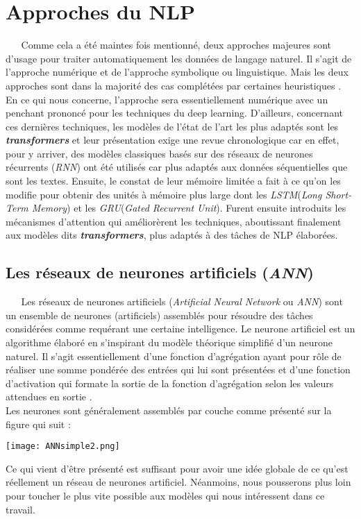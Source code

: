 \section{Approches du NLP}
$ _{} $ $ _{} $ $ _{} $ $ _{} $ $ _{} $Comme cela a été maintes fois mentionné, deux approches majeures sont d'usage pour traiter automatiquement les données de langage naturel. Il s'agit de l'approche numérique et de l'approche symbolique ou linguistique. Mais les deux approches sont dans la majorité des cas complétées par certaines heuristiques \cite{maaloul:tel-00756111}.\\
En ce qui nous concerne, l'approche sera essentiellement numérique avec un penchant prononcé pour les techniques du deep learning. D'ailleurs, concernant ces dernières techniques, les modèles de l'état de l'art les plus adaptés sont les \textbf{\textit{transformers}} et leur présentation exige une revue chronologique car en effet, pour y arriver, des modèles classiques basés sur des réseaux de neurones récurrents (\textit{RNN}) ont été utilisés car plus adaptés aux données séquentielles que sont les textes. Ensuite, le constat de leur mémoire limitée a fait à ce qu'on les modifie pour obtenir des unités à mémoire plus large dont les \textit{LSTM}(\textit{Long Short-Term Memory}) et les \textit{GRU}(\textit{Gated Recurrent Unit}). Furent ensuite introduits les mécanismes d'attention qui améliorèrent les techniques, aboutissant fi\-na\-le\-ment aux modèles dits \textit{\textbf{transformers}}, plus adaptés à des tâches de NLP élaborées.
\subsection{Les réseaux de neurones artificiels (\textit{ANN})}
$ _{} $ $ _{} $ $ _{} $ $ _{} $ $ _{} $Les réseaux de neurones artificiels (\textit{Artificial Neural Network} ou \textit{ANN}) sont un ensemble de neurones (artificiels) assemblés pour résoudre des tâches considérées comme requérant une certaine intelligence. Le neurone artificiel est un algorithme élaboré en s'inspirant du modèle théorique simplifié d'un neurone naturel. Il s'agit essentiellement d'une fonction d'agrégation ayant pour rôle de réaliser une somme pondérée des entrées qui lui sont présentées et d'une fonction d'activation qui formate la sortie de la fonction d'agrégation selon les valeurs attendues en sortie \cite{ANN}.\\
Les neurones sont généralement assemblés par couche comme présenté sur la figure qui suit :\newpage
\begin{center}
\texttt{[image: ANNsimple2.png]}
\end{center}
Ce qui vient d'être présenté est suffisant pour avoir une idée globale de ce qu'est réellement un réseau de neurones artificiel. Néanmoins, nous pousserons plus loin pour toucher le plus vite possible aux modèles qui nous intéressent dans ce travail.
